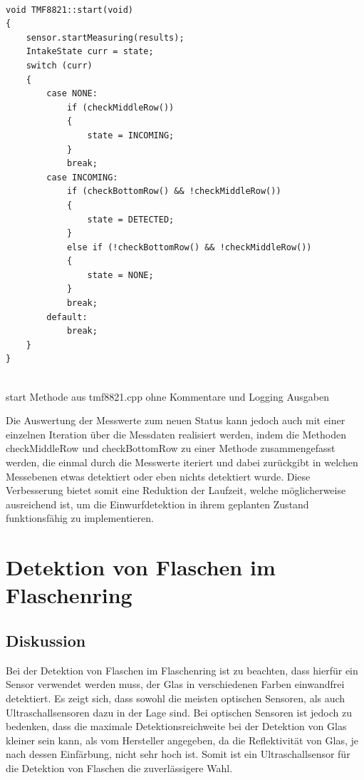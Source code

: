         \begin{listing}
            \begin{verbatim}
            
void TMF8821::start(void)
{
    sensor.startMeasuring(results);
    IntakeState curr = state;
    switch (curr) 
    {
        case NONE:
            if (checkMiddleRow())
            {
                state = INCOMING;
            }
            break;
        case INCOMING:
            if (checkBottomRow() && !checkMiddleRow())
            {
                state = DETECTED;
            }
            else if (!checkBottomRow() && !checkMiddleRow())
            {
                state = NONE;
            }
            break;
        default:
            break;
    }
}
            
            \end{verbatim}            
            \caption{start Methode aus tmf8821.cpp ohne Kommentare und Logging Ausgaben}            
            \label{lst:tmf8821_start}            
        \end{listing}

        Die Auswertung der Messwerte zum neuen Status kann jedoch auch mit einer einzelnen Iteration über die Messdaten realisiert werden, indem die Methoden checkMiddleRow und checkBottomRow zu einer Methode zusammengefasst werden, die einmal durch die Messwerte iteriert und dabei zurückgibt in welchen Messebenen etwas detektiert oder eben nichts detektiert wurde. Diese Verbesserung bietet somit eine Reduktion der Laufzeit, welche möglicherweise ausreichend ist, um die Einwurfdetektion in ihrem geplanten Zustand funktionsfähig zu implementieren.
        
\section{Detektion von Flaschen im Flaschenring}
    \subsection{Diskussion}
        Bei der Detektion von Flaschen im Flaschenring ist zu beachten, dass hierfür ein Sensor verwendet werden muss, der Glas in verschiedenen Farben einwandfrei detektiert. Es zeigt sich, dass sowohl die meisten optischen Sensoren, als auch Ultraschallsensoren dazu in der Lage sind. Bei optischen Sensoren ist jedoch zu bedenken, dass die maximale Detektionsreichweite bei der Detektion von Glas kleiner sein kann, als vom Hersteller angegeben, da die Reflektivität von Glas, je nach dessen Einfärbung, nicht sehr hoch ist. Somit ist ein Ultraschallsensor für die Detektion von Flaschen die zuverlässigere Wahl.\\

